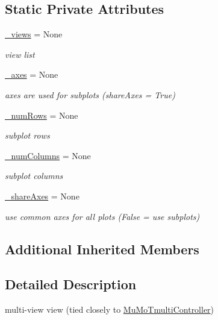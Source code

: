 \subsection*{Static Private Attributes}
\begin{DoxyCompactItemize}
\item 
\hyperlink{class_mu_mo_t_1_1_mu_mo_tmulti_view_af533f289cf818694f54ab8bd57083537}{\+\_\+views} = None
\begin{DoxyCompactList}\small\item\em view list \end{DoxyCompactList}\item 
\hyperlink{class_mu_mo_t_1_1_mu_mo_tmulti_view_a302b03ed97754a48ed830efba51e8d37}{\+\_\+axes} = None
\begin{DoxyCompactList}\small\item\em axes are used for subplots (\textquotesingle{}share\+Axes = True\textquotesingle{}) \end{DoxyCompactList}\item 
\hyperlink{class_mu_mo_t_1_1_mu_mo_tmulti_view_a7943427bc009bd206f958f785e744381}{\+\_\+num\+Rows} = None
\begin{DoxyCompactList}\small\item\em subplot rows \end{DoxyCompactList}\item 
\hyperlink{class_mu_mo_t_1_1_mu_mo_tmulti_view_ac14e35edb2af762045879408234589d5}{\+\_\+num\+Columns} = None
\begin{DoxyCompactList}\small\item\em subplot columns \end{DoxyCompactList}\item 
\hyperlink{class_mu_mo_t_1_1_mu_mo_tmulti_view_a564f1d8714ede71e8f36f29d64193518}{\+\_\+share\+Axes} = None
\begin{DoxyCompactList}\small\item\em use common axes for all plots (False = use subplots) \end{DoxyCompactList}\end{DoxyCompactItemize}
\subsection*{Additional Inherited Members}


\subsection{Detailed Description}
multi-\/view view (tied closely to \hyperlink{class_mu_mo_t_1_1_mu_mo_tmulti_controller}{Mu\+Mo\+Tmulti\+Controller}) 

